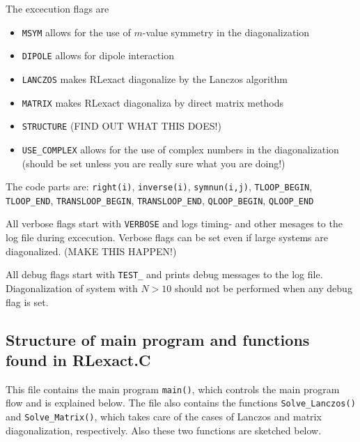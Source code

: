 \documentclass{article}
\begin{document}
The excecution flags are
\begin{itemize}
\item \verb+MSYM+ allows for the use of $m$-value symmetry in the diagonalization
\item \verb+DIPOLE+ allows for dipole interaction
\item \verb+LANCZOS+ makes RLexact diagonalize by the Lanczos algorithm
\item \verb+MATRIX+ makes RLexact diagonaliza by direct matrix methods
\item \verb+STRUCTURE+ (FIND OUT WHAT THIS DOES!)
\item \verb+USE_COMPLEX+ allows for the use of complex numbers in the diagonalization (should be set unless you are really sure what you are doing!)
\end{itemize}

The code parts are: 
\verb+right(i)+, \verb+inverse(i)+, \verb+symnun(i,j)+, \verb+TLOOP_BEGIN+, \verb+TLOOP_END+, \verb+TRANSLOOP_BEGIN+, \verb+TRANSLOOP_END+, \verb+QLOOP_BEGIN+, \verb+QLOOP_END+

All verbose flags start with \verb+VERBOSE+ and logs timing- and other mesages to the log file during excecution. 
Verbose flags can be set even if large systems are diagonalized. (MAKE THIS HAPPEN!)

All debug flags start with \verb+TEST_+ and prints debug messages to the log file. Diagonalization of system with 
$N>10$ should not be performed when any debug flag is set.


\subsection{Structure of main program and functions found in RLexact.C}
This file contains the main program \verb+main()+, which controls the main program flow and is explained below.
The file also contains the functions \verb+Solve_Lanczos()+ and \verb+Solve_Matrix()+, which takes care of the cases of Lanczos 
and matrix diagonalization, respectively. Also these two functions are sketched below.
\end{document}
